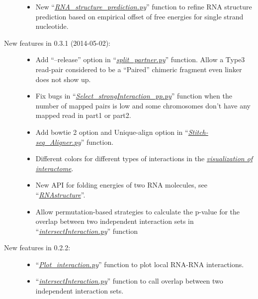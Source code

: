 \documentclass[letterpaper,10pt,english]{sphinxmanual}
\begin{document}
\begin{description}
\begin{itemize}
\item {} 
New ``{\hyperref[Analysis_pipeline:structure]{\emph{RNA\_structure\_prediction.py}}}'' function to refine RNA structure prediction based on empirical offset of free energies for single strand nucleotide.

\end{itemize}

\item[{New features in 0.3.1 (2014-05-02):}] \leavevmode\begin{itemize}
\item {} 
Add ``--release'' option in ``{\hyperref[Analysis_pipeline:step4]{\emph{split\_partner.py}}}'' function. Allow a Type3 read-pair considered to be a ``Paired'' chimeric fragment even linker does not show up.

\item {} 
Fix bugs in ``{\hyperref[Analysis_pipeline:step6]{\emph{Select\_strongInteraction\_pp.py}}}'' function when the number of mapped pairs is low and some chromosomes don't have any mapped read in part1 or part2.

\item {} 
Add bowtie 2 option and Unique-align option in ``{\hyperref[Analysis_pipeline:step5]{\emph{Stitch-seq\_Aligner.py}}}'' function.

\item {} 
Different colors for different types of interactions in the {\hyperref[Visualization:visualizationglobal]{\emph{visualization of interactome}}}.

\item {} 
New API for folding energies of two RNA molecules, see ``{\hyperref[Other_api:rnafold]{\emph{RNAstructure}}}''.

\item {} 
Allow permutation-based strategies to calculate the p-value for the overlap between two independent interaction sets in ``{\hyperref[Analysis_pipeline:intersection]{\emph{intersectInteraction.py}}}'' function

\end{itemize}

\item[{New features in 0.2.2:}] \leavevmode\begin{itemize}
\item {} 
``{\hyperref[Visualization:plotinteraction]{\emph{Plot\_interaction.py}}}'' function to plot local RNA-RNA interactions.

\item {} 
``{\hyperref[Analysis_pipeline:intersection]{\emph{intersectInteraction.py}}}'' function to call overlap between two independent interaction sets.

\end{itemize}

\end{description}
\end{document}
